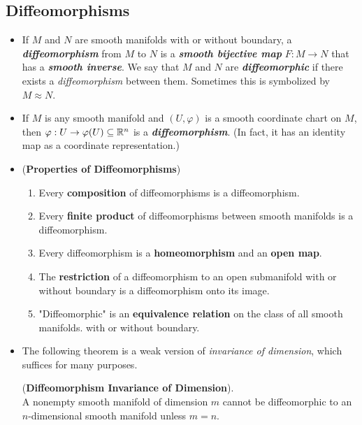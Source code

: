 \documentclass[11pt]{article}
\begin{document}
\subsection{Diffeomorphisms}
\begin{itemize}
\item \begin{definition}
If $M$ and $N$ are smooth manifolds with or without boundary, a \emph{\textbf{diffeomorphism}} from $M$ to $N$ is a \emph{\textbf{smooth bijective map}} $F: M \rightarrow N$ that has a \emph{\textbf{smooth inverse}}. We say that $M$ and $N$ are \emph{\textbf{diffeomorphic}} if there exists a \emph{diffeomorphism} between them. Sometimes this is symbolized by $M \approx N$.
\end{definition}

\item \begin{example}
If $M$ is any smooth manifold and $(U, \varphi)$ is a smooth coordinate chart on $M$, then $\varphi: U \rightarrow \varphi(U) \subseteq {\mathbb R}^n$ is a \emph{\textbf{diffeomorphism}}. (In fact, it has an identity map as a coordinate representation.)
\end{example}

\item \begin{proposition} (\textbf{Properties of Diffeomorphisms})
\begin{enumerate}
\item Every \textbf{composition} of diffeomorphisms is a diffeomorphism.
\item Every \textbf{finite product} of diffeomorphisms between smooth manifolds is a diffeomorphism.
\item Every diffeomorphism is a \textbf{homeomorphism} and an \textbf{open map}.
\item The \textbf{restriction} of a diffeomorphism to an open submanifold with or without boundary is a diffeomorphism onto its image.
\item "Diffeomorphic" is an \textbf{equivalence relation} on the class of all smooth manifolds.
with or without boundary.
\end{enumerate}
\end{proposition}

\item The following theorem is a weak version of \emph{invariance of dimension}, which suffices for many purposes.
\begin{theorem} (\textbf{Diffeomorphism Invariance of Dimension}).\\
A nonempty smooth manifold of dimension $m$ cannot be diffeomorphic to an $n$-dimensional smooth manifold unless $m = n$.
\end{theorem}


\end{itemize}
\end{document}
